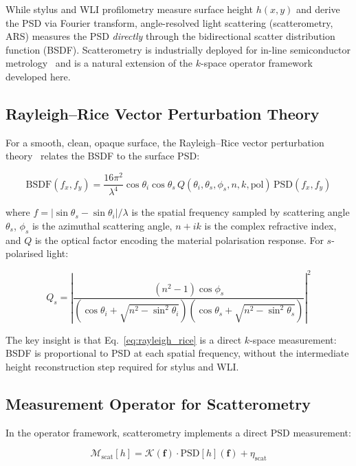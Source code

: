 \documentclass[review,12pt]{elsarticle}
\begin{document}
While stylus and WLI profilometry measure surface height $h(x,y)$ and derive the PSD via Fourier transform, angle-resolved light scattering (scatterometry, ARS) measures the PSD \textit{directly} through the bidirectional scatter distribution function (BSDF). Scatterometry is industrially deployed for in-line semiconductor metrology~\cite{stover1995optical} and is a natural extension of the $k$-space operator framework developed here.

\subsection{Rayleigh--Rice Vector Perturbation Theory}

For a smooth, clean, opaque surface, the Rayleigh--Rice vector perturbation theory~\cite{elson1979relation} relates the BSDF to the surface PSD:

\begin{equation}
    \mathrm{BSDF}(f_x,f_y) = \frac{16\pi^2}{\lambda^4} \cos\theta_i \cos\theta_s \, Q(\theta_i,\theta_s,\phi_s,n,k,\mathrm{pol}) \, \mathrm{PSD}(f_x,f_y)
    \label{eq:rayleigh_rice}
\end{equation}

where $f = |\sin\theta_s - \sin\theta_i|/\lambda$ is the spatial frequency sampled by scattering angle $\theta_s$, $\phi_s$ is the azimuthal scattering angle, $n + ik$ is the complex refractive index, and $Q$ is the optical factor encoding the material polarisation response. For $s$-polarised light:

\begin{equation}
    Q_s = \left|\frac{(n^2-1)\cos\phi_s}{(\cos\theta_i + \sqrt{n^2-\sin^2\theta_i})(\cos\theta_s + \sqrt{n^2-\sin^2\theta_s})}\right|^2
\end{equation}

The key insight is that Eq.~\eqref{eq:rayleigh_rice} is a direct $k$-space measurement: BSDF is proportional to PSD at each spatial frequency, without the intermediate height reconstruction step required for stylus and WLI.

\subsection{Measurement Operator for Scatterometry}

In the operator framework, scatterometry implements a direct PSD measurement:

\begin{equation}
    \mathcal{M}_\mathrm{scat}[h] = \mathcal{K}(\mathbf{f}) \cdot \mathrm{PSD}[h](\mathbf{f}) + \eta_\mathrm{scat}
\end{equation}
\end{document}
